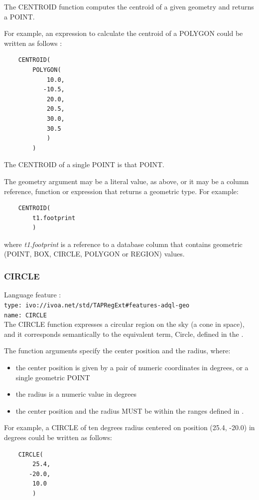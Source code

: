 \documentclass[11pt,a4paper]{ivoa}
\begin{document}
The CENTROID function computes the centroid of a given geometry and returns a POINT.

For example, an expression to calculate the centroid of a POLYGON could
be written as follows :
\begin{verbatim}
    CENTROID(
        POLYGON(
            10.0,
           -10.5,
            20.0,
            20.5,
            30.0,
            30.5
            )
        )
\end{verbatim}

The CENTROID of a single POINT is that POINT.

The geometry argument may be a literal value, as above, or it may be a
column reference, function or expression that returns a geometric type.
For example:
\begin{verbatim}
    CENTROID(
        t1.footprint
        )
\end{verbatim}
where \textit{t1.footprint} is a reference to a database column that
contains geometric (POINT, BOX, CIRCLE, POLYGON or REGION) values.

\subsubsection{CIRCLE}
\label{sec:functions.geom.circle}
{\footnotesize Language feature :}\\
{\footnotesize \verb|type: ivo://ivoa.net/std/TAPRegExt#features-adql-geo|}\\
{\footnotesize \verb|name: CIRCLE|}\\

The CIRCLE function expresses a circular region on the sky (a cone in space),
and it corresponds semantically to the equivalent term, Circle, defined in
the \STCSpec{}.

The function arguments specify the center position and the radius, where:
\begin{itemize}
    \item the center position is given by a pair of numeric coordinates
    in degrees, or a single geometric POINT
    \item the radius is a numeric value in degrees
    \item the center position and the radius MUST be within the ranges defined in
    .
\end{itemize}

For example, a CIRCLE of ten degrees radius centered on position
(25.4, -20.0) in degrees could be written as follows:
\begin{verbatim}
    CIRCLE(
        25.4,
       -20.0,
        10.0
        )
\end{verbatim}
\end{document}
